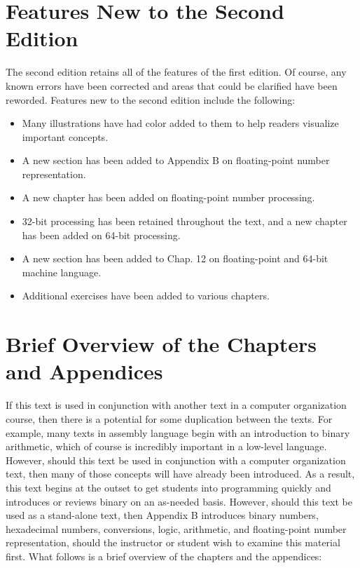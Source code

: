 \documentclass[10pt]{article}
\begin{document}
\section*{Features New to the Second Edition}
The second edition retains all of the features of the first edition. Of course, any known errors have been corrected and areas that could be clarified have been reworded. Features new to the second edition include the following:

\begin{itemize}
  \item Many illustrations have had color added to them to help readers visualize important concepts.
  \item A new section has been added to Appendix B on floating-point number representation.
  \item A new chapter has been added on floating-point number processing.
  \item 32-bit processing has been retained throughout the text, and a new chapter has been added on 64-bit processing.
  \item A new section has been added to Chap. 12 on floating-point and 64-bit machine language.
  \item Additional exercises have been added to various chapters.
\end{itemize}

\section*{Brief Overview of the Chapters and Appendices}
If this text is used in conjunction with another text in a computer organization course, then there is a potential for some duplication between the texts. For example, many texts in assembly language begin with an introduction to binary arithmetic, which of course is incredibly important in a low-level language. However, should this text be used in conjunction with a computer organization text, then many of those concepts will have already been introduced. As a result, this text begins at the outset to get students into programming quickly and introduces or reviews binary on an as-needed basis. However, should this text be used as a stand-alone text, then Appendix B introduces binary numbers, hexadecimal numbers, conversions, logic, arithmetic, and floating-point number representation, should the instructor or student wish to examine this material first. What follows is a brief overview of the chapters and the appendices:
\end{document}
